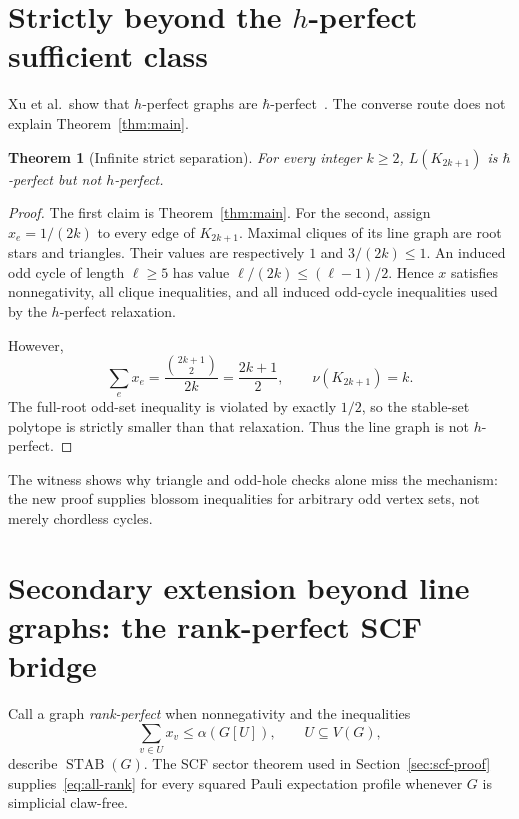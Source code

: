 \documentclass[11pt,a4paper]{article}
\newtheorem{theorem}{Theorem}[section]
\theoremstyle{remark}
\newcommand{\STAB}{\operatorname{STAB}}
\begin{document}
\section{Strictly beyond the \texorpdfstring{$h$}{h}-perfect sufficient class}

Xu et al.~show that $h$-perfect graphs are $\hbar$-perfect~\cite{xu}. The
converse route does not explain Theorem~\ref{thm:main}.

\begin{theorem}[Infinite strict separation]
For every integer $k\geq2$, $L(K_{2k+1})$ is $\hbar$-perfect but not
$h$-perfect.
\end{theorem}

\begin{proof}
The first claim is Theorem~\ref{thm:main}. For the second, assign
$x_e=1/(2k)$ to every edge of $K_{2k+1}$. Maximal cliques of its line graph
are root stars and triangles. Their values are respectively $1$ and
$3/(2k)\leq1$. An induced odd cycle of length $\ell\geq5$ has value
$\ell/(2k)\leq(\ell-1)/2$. Hence $x$ satisfies nonnegativity, all clique
inequalities, and all induced odd-cycle inequalities used by the $h$-perfect
relaxation.

However,
\[
 \sum_e x_e=\frac{\binom{2k+1}{2}}{2k}=\frac{2k+1}{2},
 \qquad \nu(K_{2k+1})=k.
\]
The full-root odd-set inequality is violated by exactly $1/2$, so the stable-set
polytope is strictly smaller than that relaxation. Thus the line graph is not
$h$-perfect.
\end{proof}

The witness shows why triangle and odd-hole checks alone miss the mechanism:
the new proof supplies blossom inequalities for arbitrary odd vertex sets,
not merely chordless cycles.

\section{Secondary extension beyond line graphs: the rank-perfect SCF bridge}

Call a graph \emph{rank-perfect} when nonnegativity and the inequalities
\begin{equation}\label{eq:all-rank}
 \sum_{v\in U}x_v\leq\alpha(G[U]),\qquad U\subseteq V(G),
\end{equation}
describe $\STAB(G)$. The SCF sector theorem used in
Section~\ref{sec:scf-proof} supplies~\eqref{eq:all-rank} for every squared Pauli expectation
profile whenever $G$ is simplicial claw-free.
\end{document}
